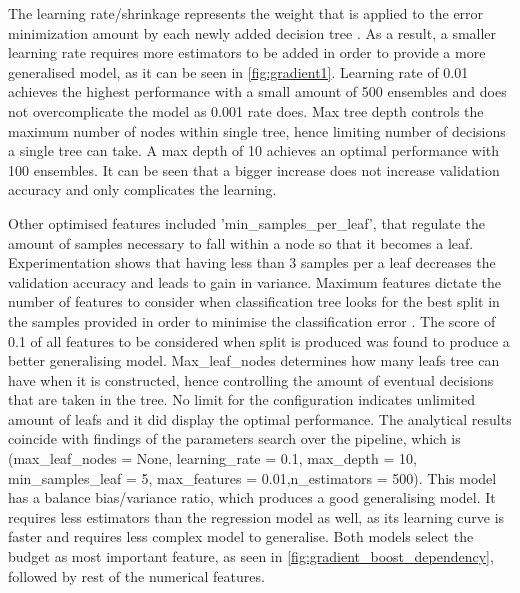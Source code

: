 The learning rate/shrinkage represents the weight that is applied to the error minimization amount by each newly added decision tree \cite{biasvariance}. As a result, a smaller learning rate requires more estimators to be added in order to provide a more generalised model, as it can be seen in \figurename{} \ref{fig:gradient1}. Learning rate of 0.01 achieves the highest performance with a small amount of 500 ensembles and does not overcomplicate the model as 0.001 rate does. Max tree depth controls the maximum number of nodes within single tree, hence limiting number of decisions a single tree can take. A max depth of 10 achieves an optimal performance with 100 ensembles. It can be seen that a bigger increase does not increase validation accuracy and only complicates the learning. 

Other optimised features included 'min\_samples\_per\_leaf', that regulate the amount of samples necessary to fall within a node so that it becomes a leaf. Experimentation shows that having less than 3 samples per a leaf decreases the validation accuracy and leads to gain in variance.  Maximum features dictate the number of features to consider when classification tree looks for the best split in the samples provided in order to minimise the classification error \cite{tan2006classification}. The score of 0.1 of all features to be considered when split is produced was found to produce a better generalising model. Max\_leaf\_nodes determines how many leafs tree can have when it is constructed, hence controlling the amount of eventual decisions that are taken in the tree. No limit for the configuration indicates unlimited amount of leafs and it did display the optimal performance.  The analytical results coincide with findings of the parameters search over the pipeline, which is (max\_leaf\_nodes = None, learning\_rate = 0.1, max\_depth =  10, min\_samples\_leaf = 5, max\_features = 0.01,n\_estimators = 500).­ This model has a balance bias/variance ratio, which produces a good generalising model. It requires less estimators than the regression model as well, as its learning curve is faster and requires less complex model to generalise. Both models select the budget as most important feature, as seen in \figurename{} \ref{fig:gradient_boost_dependency}, followed by rest of the numerical features.


